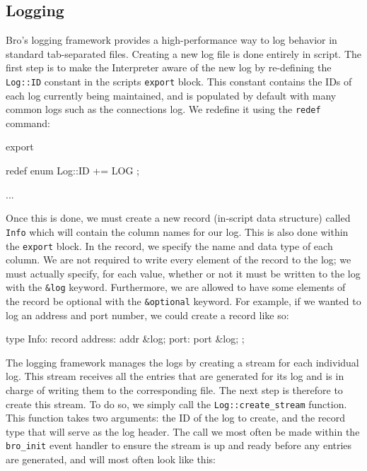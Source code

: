 \subsection{Logging} \label{section: logging}
Bro's logging framework provides a high-performance way to log behavior in standard tab-separated files. Creating a new log file is done entirely in script. The first step is to make the Interpreter aware of the new log by re-defining the \texttt{Log::ID} constant in the scripts \texttt{export} block. This constant contains the IDs of each log currently being maintained, and is populated by default with many common logs such as the connections log. We redefine it using the \texttt{redef} command: \\

\begin{code}
export {
	redef enum Log::ID += { LOG };
	
	
	...
}
\end{code}

Once this is done, we must create a new record (in-script data structure) called \texttt{Info} which will contain the column names for our log. This is also done within the \texttt{export} block. In the record, we specify the name and data type of each column. We are not required to write every element of the record to the log; we must actually specify, for each value, whether or not it must be written to the log with the \texttt{\&log} keyword. Furthermore, we are allowed to have some elements of the record be optional with the \texttt{\&optional} keyword. For example, if we wanted to log an address and port number, we could create a record like so: \\

\begin{code}
	type Info: record {
		address:		addr &log;
		port:			port &log;	
	};
\end{code}

The logging framework manages the logs by creating a stream for each individual log. This stream receives all the entries that are generated for its log and is in charge of writing them to the corresponding file. The next step is therefore to create this stream. To do so, we simply call the \texttt{Log::create\_stream} function. This function takes two arguments: the ID of the log to create, and the record type that will serve as the log header. The call we most often be made within the \texttt{bro\_init} event handler to ensure the stream is up and ready before any entries are generated, and will most often look like this:\\

